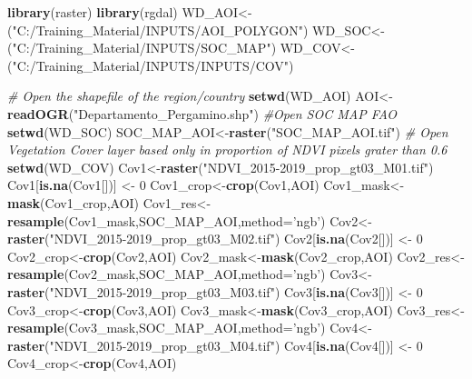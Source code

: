 \documentclass[
  10pt,
  b5paper,
]{book}
\newenvironment{Shaded}{\begin{snugshade}}{\end{snugshade}}
\newcommand{\CommentTok}[1]{\textcolor[rgb]{0.56,0.35,0.01}{\textit{#1}}}
\newcommand{\DataTypeTok}[1]{\textcolor[rgb]{0.13,0.29,0.53}{#1}}
\newcommand{\DecValTok}[1]{\textcolor[rgb]{0.00,0.00,0.81}{#1}}
\newcommand{\KeywordTok}[1]{\textcolor[rgb]{0.13,0.29,0.53}{\textbf{#1}}}
\newcommand{\NormalTok}[1]{#1}
\newcommand{\StringTok}[1]{\textcolor[rgb]{0.31,0.60,0.02}{#1}}
\begin{document}
\begin{Shaded}
\begin{Highlighting}[]
\KeywordTok{library}\NormalTok{(raster)}
\KeywordTok{library}\NormalTok{(rgdal)}
\NormalTok{WD_AOI<-(}\StringTok{"C:/Training_Material/INPUTS/AOI_POLYGON"}\NormalTok{)}
\NormalTok{WD_SOC<-(}\StringTok{"C:/Training_Material/INPUTS/SOC_MAP"}\NormalTok{)}
\NormalTok{WD_COV<-(}\StringTok{"C:/Training_Material/INPUTS/INPUTS/COV"}\NormalTok{)}


\CommentTok{# Open the shapefile of the region/country}
\KeywordTok{setwd}\NormalTok{(WD_AOI)}
\NormalTok{AOI<-}\KeywordTok{readOGR}\NormalTok{(}\StringTok{"Departamento_Pergamino.shp"}\NormalTok{)}
\CommentTok{#Open SOC MAP FAO}
\KeywordTok{setwd}\NormalTok{(WD_SOC)}
\NormalTok{SOC_MAP_AOI<-}\KeywordTok{raster}\NormalTok{(}\StringTok{"SOC_MAP_AOI.tif"}\NormalTok{)}
\CommentTok{# Open Vegetation Cover layer based only in proportion of NDVI pixels grater than 0.6 }
\KeywordTok{setwd}\NormalTok{(WD_COV)}
\NormalTok{Cov1<-}\KeywordTok{raster}\NormalTok{(}\StringTok{"NDVI_2015-2019_prop_gt03_M01.tif"}\NormalTok{)}
\NormalTok{Cov1[}\KeywordTok{is.na}\NormalTok{(Cov1[])] <-}\StringTok{ }\DecValTok{0}
\NormalTok{Cov1_crop<-}\KeywordTok{crop}\NormalTok{(Cov1,AOI)}
\NormalTok{Cov1_mask<-}\KeywordTok{mask}\NormalTok{(Cov1_crop,AOI)}
\NormalTok{Cov1_res<-}\KeywordTok{resample}\NormalTok{(Cov1_mask,SOC_MAP_AOI,}\DataTypeTok{method=}\StringTok{'ngb'}\NormalTok{) }
\NormalTok{Cov2<-}\KeywordTok{raster}\NormalTok{(}\StringTok{"NDVI_2015-2019_prop_gt03_M02.tif"}\NormalTok{)}
\NormalTok{Cov2[}\KeywordTok{is.na}\NormalTok{(Cov2[])] <-}\StringTok{ }\DecValTok{0}
\NormalTok{Cov2_crop<-}\KeywordTok{crop}\NormalTok{(Cov2,AOI)}
\NormalTok{Cov2_mask<-}\KeywordTok{mask}\NormalTok{(Cov2_crop,AOI)}
\NormalTok{Cov2_res<-}\KeywordTok{resample}\NormalTok{(Cov2_mask,SOC_MAP_AOI,}\DataTypeTok{method=}\StringTok{'ngb'}\NormalTok{) }
\NormalTok{Cov3<-}\KeywordTok{raster}\NormalTok{(}\StringTok{"NDVI_2015-2019_prop_gt03_M03.tif"}\NormalTok{)}
\NormalTok{Cov3[}\KeywordTok{is.na}\NormalTok{(Cov3[])] <-}\StringTok{ }\DecValTok{0}
\NormalTok{Cov3_crop<-}\KeywordTok{crop}\NormalTok{(Cov3,AOI)}
\NormalTok{Cov3_mask<-}\KeywordTok{mask}\NormalTok{(Cov3_crop,AOI)}
\NormalTok{Cov3_res<-}\KeywordTok{resample}\NormalTok{(Cov3_mask,SOC_MAP_AOI,}\DataTypeTok{method=}\StringTok{'ngb'}\NormalTok{) }
\NormalTok{Cov4<-}\KeywordTok{raster}\NormalTok{(}\StringTok{"NDVI_2015-2019_prop_gt03_M04.tif"}\NormalTok{)}
\NormalTok{Cov4[}\KeywordTok{is.na}\NormalTok{(Cov4[])] <-}\StringTok{ }\DecValTok{0}
\NormalTok{Cov4_crop<-}\KeywordTok{crop}\NormalTok{(Cov4,AOI)}

\end{Highlighting}
\end{Shaded}
\end{document}
